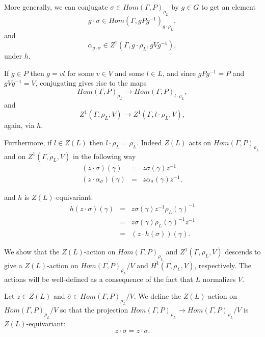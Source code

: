 More generally, we can conjugate $\sigma\in Hom(\Gamma, P)_{\rho_L}$ by $g \in G$ to get an element 
\begin{displaymath}
  g \cdot \sigma \in Hom(\Gamma, gPg^{-1})_{g\cdot\rho_L},
\end{displaymath}
and
\begin{displaymath}
  \alpha_{g \cdot \sigma} \in Z^1(\Gamma, g\cdot\rho_L, gVg^{-1}),
\end{displaymath}
under $h$.

If $g\in P$ then $g=vl$ for some $v\in V$ and some $l\in L$, and since $gPg^{-1} = P$ and $gVg^{-1} = V$, conjugating gives rise to the maps
\begin{displaymath}
  Hom(\Gamma, P)_{\rho_L} \rightarrow Hom(\Gamma, P)_{l\cdot\rho_L},
\end{displaymath}
and
\begin{displaymath}
  Z^1(\Gamma, \rho_L, V)\rightarrow Z^1(\Gamma, l\cdot\rho_L, V),
\end{displaymath}
again, via $h$.

Furthermore, if $l\in Z(L)$ then $l\cdot\rho_L = \rho_L$. Indeed $Z(L)$ acts on $Hom(\Gamma, P)_{\rho_L}$ and on $Z^1(\Gamma, \rho_L, V)$ in the following way
\begin{eqnarray*}
  (z \cdot \sigma) (\gamma) &=& z \sigma(\gamma) z^{-1} \\
  (z \cdot \alpha_\sigma) (\gamma) &=&  z \alpha_\sigma(\gamma) z^{-1},
\end{eqnarray*}

and $h$ is $Z(L)$-equivariant:
\begin{eqnarray*}
  h(z \cdot \sigma)(\gamma) &=&  z \sigma(\gamma) z^{-1} \rho_L(\gamma)^{-1} \\
  &=& z \sigma(\gamma) \rho_L(\gamma)^{-1} z^{-1} \\
  &=& (z \cdot h(\sigma))(\gamma).
\end{eqnarray*}

We show that the $Z(L)$-action on $Hom(\Gamma, P)_{\rho_L}$ and $Z^1(\Gamma, \rho_L, V)$ descends to give a $Z(L)$-action on $Hom(\Gamma, P)_{\rho_L}/V$ and $H^1(\Gamma, \rho_L, V)$, respectively. The actions will be well-defined as a consequence of the fact that $L$ normalizes $V$.

Let $z \in Z(L)$ and $\overline{\sigma} \in Hom(\Gamma, P)_{\rho_L}/V$. We define the $Z(L)$-action on $Hom(\Gamma, P)_{\rho_L}/V$ so that the projection $Hom(\Gamma, P)_{\rho_L} \rightarrow Hom(\Gamma, P)_{\rho_L}/V$ is $Z(L)$-equivariant:
\begin{displaymath}
  z \cdot \overline{\sigma} = \overline{z \cdot \sigma}.
\end{displaymath}

